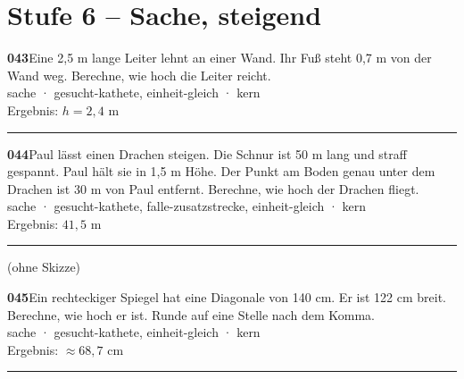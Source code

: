 \documentclass[10pt]{article}
\begin{document}
\section*{Stufe 6 – Sache, steigend}
\begin{minipage}[t]{\linewidth}
\parbox[t]{5.8cm}{}\hfill\parbox[t]{11.6cm}{\textbf{043}\quad Eine 2,5 m lange Leiter lehnt an einer Wand. Ihr Fuß steht 0,7 m von der Wand weg. Berechne, wie hoch die Leiter reicht.\\[2pt]{\color{gray}\footnotesize sache · gesucht-kathete, einheit-gleich · kern\\Ergebnis: $h = 2{,}4$ m}}
\end{minipage}\par\medskip\hrule\medskip
\begin{minipage}[t]{\linewidth}
\parbox[t]{5.8cm}{}\hfill\parbox[t]{11.6cm}{\textbf{044}\quad Paul lässt einen Drachen steigen. Die Schnur ist 50 m lang und straff gespannt. Paul hält sie in 1,5 m Höhe. Der Punkt am Boden genau unter dem Drachen ist 30 m von Paul entfernt. Berechne, wie hoch der Drachen fliegt.\\[2pt]{\color{gray}\footnotesize sache · gesucht-kathete, falle-zusatzstrecke, einheit-gleich · kern\\Ergebnis: $41{,}5$ m}}
\end{minipage}\par\medskip\hrule\medskip
\begin{minipage}[t]{\linewidth}
\parbox[t]{5.8cm}{\parbox[t]{5.5cm}{\color{gray}\small (ohne Skizze)}}\hfill\parbox[t]{11.6cm}{\textbf{045}\quad Ein rechteckiger Spiegel hat eine Diagonale von 140 cm. Er ist 122 cm breit. Berechne, wie hoch er ist. Runde auf eine Stelle nach dem Komma.\\[2pt]{\color{gray}\footnotesize sache · gesucht-kathete, einheit-gleich · kern\\Ergebnis: $\approx 68{,}7$ cm}}
\end{minipage}\par\medskip\hrule\medskip
\end{document}
